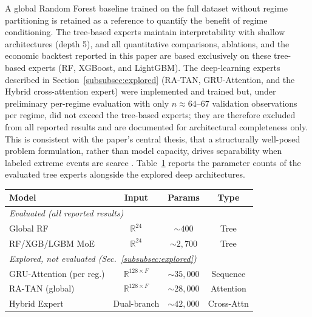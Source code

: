 \documentclass[]{interact}
\begin{document}
A global Random Forest baseline trained on the full dataset without regime partitioning is retained as a reference to quantify the benefit of regime conditioning. The tree-based experts maintain interpretability with shallow architectures (depth 5), and all quantitative comparisons, ablations, and the economic backtest reported in this paper are based exclusively on these tree-based experts (RF, XGBoost, and LightGBM). The deep-learning experts described in Section~\ref{subsubsec:explored} (RA-TAN, GRU-Attention, and the Hybrid cross-attention expert) were implemented and trained but, under preliminary per-regime evaluation with only $n\!\approx\!64$--$67$ validation observations per regime, did not exceed the tree-based experts; they are therefore excluded from all reported results and are documented for architectural completeness only. This is consistent with the paper's central thesis, that a structurally well-posed problem formulation, rather than model capacity, drives separability when labeled extreme events are scarce \citep{arrieta2020explainable}. Table~\ref{tab:model_complexity} reports the parameter counts of the evaluated tree experts alongside the explored deep architectures.

\begin{table}[t]
{\footnotesize
\renewcommand{\arraystretch}{1.25}
\begin{tabular}{lccc}
\toprule
\textbf{Model} & \textbf{Input} & \textbf{Params} & \textbf{Type} \\
\midrule
\multicolumn{4}{l}{\emph{Evaluated (all reported results)}} \\
Global RF              & $\mathbb{R}^{24}$         & $\sim 400$      & Tree        \\
RF/XGB/LGBM MoE        & $\mathbb{R}^{24}$         & $\sim 2{,}700$  & Tree        \\
\midrule
\multicolumn{4}{l}{\emph{Explored, not evaluated (Sec.~\ref{subsubsec:explored})}} \\
GRU-Attention (per reg.)& $\mathbb{R}^{128 \times F}$& $\sim 35{,}000$ & Sequence    \\
RA-TAN (global)         & $\mathbb{R}^{128 \times F}$& $\sim 28{,}000$ & Attention   \\
Hybrid Expert           & Dual-branch                & $\sim 42{,}000$ & Cross-Attn \\
\bottomrule
\end{tabular}}
\label{tab:model_complexity}
\end{table}
\end{document}

